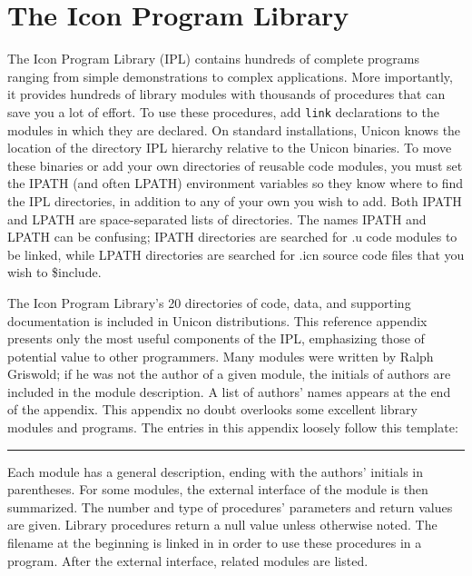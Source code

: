 \chapter{The Icon Program Library}

The Icon Program Library (IPL) contains
hundreds of complete programs ranging from simple demonstrations to
complex applications. More importantly, it provides hundreds of
library modules with thousands of procedures that can save you a lot
of effort. To use these procedures, add \texttt{link}
declarations to the modules in which they are declared. On standard
installations, Unicon knows the location of the directory IPL
hierarchy relative to the Unicon binaries. To move these binaries or
add your own directories of reusable code modules, you must set the
IPATH (and often LPATH)
environment variables so they know
where to find the IPL directories, in addition to any of your own you
wish to add. Both IPATH and LPATH are space-separated lists of
directories. The names IPATH and LPATH can be confusing; IPATH
directories are searched for .u code modules to be linked,
while LPATH directories are searched for .icn
source code files that you wish to \$include.

The Icon Program Library's 20 directories of code, data, and
supporting documentation is included in Unicon
distributions. This reference appendix presents
only the most useful components of the IPL, emphasizing those of
potential value to other programmers.  Many modules were written by
Ralph Griswold; if he was not the author of a given
module, the initials of authors are included in the module
description. A list of authors' names appears at the end of the
appendix. This appendix no doubt overlooks some excellent library
modules and programs.  The entries in this appendix loosely follow
this template:

\vspace{0.25cm}\hrule{}

Each module has a general description, ending
with the authors' initials in parentheses. For some modules,
the external interface of the module is then summarized.
The number and type of procedures' parameters and
return values are given. Library procedures return a
null value unless otherwise noted. The filename at the beginning is
linked in in order to use these procedures in a
program. After the external interface, related modules
are listed.

